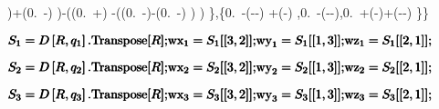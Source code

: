 \documentclass{article}
\begin{document}
\begin{doublespace}
\left[q_1\right]\right)+\left(0.\, -\left[q_1\right] \left[q_2\right]\right) \left[q_3\right]\right)-\left(\left(0.\,
+\left[q_1\right]\right) \left[q_4\right]-\left(\left[q_3\right] \left(0.\, -\left[q_1\right] \left[q_2\right]\right)-\left(0.\,
-\left[q_2\right] \left[q_1\right]\right) \left[q_3\right]\right) \left[q_4\right]\right) \left[q_5\right]\right\},\left\{0.\,
-\left[q_5\right] \left(-\left[q_2\right] \left[q_3\right]-\left[q_2\right] \left[q_3\right]\right)
\left[q_4\right]+\left(\left[q_3\right] \left[q_2\right]-\left[q_2\right] \left[q_3\right]\right)
\left[q_5\right],0.\, -\left[q_4\right] \left(-\left[q_2\right] \left[q_3\right]-\left[q_2\right]
\left[q_3\right]\right),0.\, +\left[q_5\right] \left(\left[q_3\right] \left[q_2\right]-\left[q_2\right]
\left[q_3\right]\right)+\left(-\left[q_2\right] \left[q_3\right]-\left[q_2\right] \left[q_3\right]\right)
\left[q_4\right] \left[q_5\right]\right\}\right\}\)
\end{doublespace}

\begin{doublespace}
\noindent\(\pmb{S_1=D\left[R,q_1\right].\text{Transpose}[R];}\\
\pmb{\text{wx}_1=S_1[[3,2]];}\\
\pmb{\text{wy}_1=S_1[[1,3]];}\\
\pmb{\text{wz}_1=S_1[[2,1]];}\\
\pmb{}\)
\end{doublespace}

\begin{doublespace}
\noindent\(\pmb{S_2=D\left[R,q_2\right].\text{Transpose}[R];}\\
\pmb{\text{wx}_2=S_2[[3,2]];}\\
\pmb{\text{wy}_2=S_2[[1,3]];}\\
\pmb{\text{wz}_2=S_2[[2,1]];}\\
\pmb{}\)
\end{doublespace}

\begin{doublespace}
\noindent\(\pmb{\text{}}\\
\pmb{S_3=D\left[R,q_3\right].\text{Transpose}[R];}\\
\pmb{\text{wx}_3=S_3[[3,2]];}\\
\pmb{\text{wy}_3=S_3[[1,3]];}\\
\pmb{\text{wz}_3=S_3[[2,1]];}\)
\end{doublespace}
\end{document}
